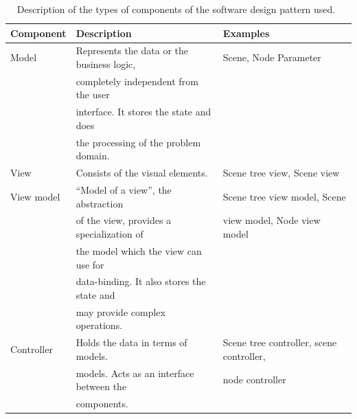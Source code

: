 \documentclass[%
    a4paper,    %
    justified,  %
    nobib,      %
    openany     %
]{tufte-book}
\makeatletter
\renewcommand{\label}[1]{\@tufte@label{##1}}%
\makeatother
\begin{document}
\begin{table}[h]
  \begin{tabularx}{\textwidth}{llX}
    \toprule
    \textbf{Component} & \textbf{Description} & \textbf{Examples} \\
    \midrule
    Model      & Represents the data or the business logic, & Scene, Node
                                                              Parameter\\
               & completely independent from the user       & \\
               & interface. It stores the state and does    & \\
               & the processing of the problem domain.      & \\
    \midrule
    View       & Consists of the visual elements.           & Scene tree view,
                                                              Scene view\\
    \midrule
    View model & \enquote{Model of a view}, the abstraction & Scene tree view
                                                              model, Scene\\
               & of the view, provides a specialization of  & view model, Node
                                                              view model\\
               & the model which the view can use for       & \\
               & data-binding. It also stores the state and & \\
               & may provide complex operations.            & \\
    \midrule
    Controller & Holds the data in terms of models.         & Scene tree
                                                              controller, scene
                                                              controller,\\
               & models. Acts as an interface between the   & node controller\\
               & components.                                & \\
    \bottomrule
  \end{tabularx}
  \caption{Description of the types of components of the software design
    pattern used.~\cite{fowler-presentation-2004, gossman-mvvm-2005}}
  \label{table:software-design-pattern-components}
\end{table}
\end{document}

